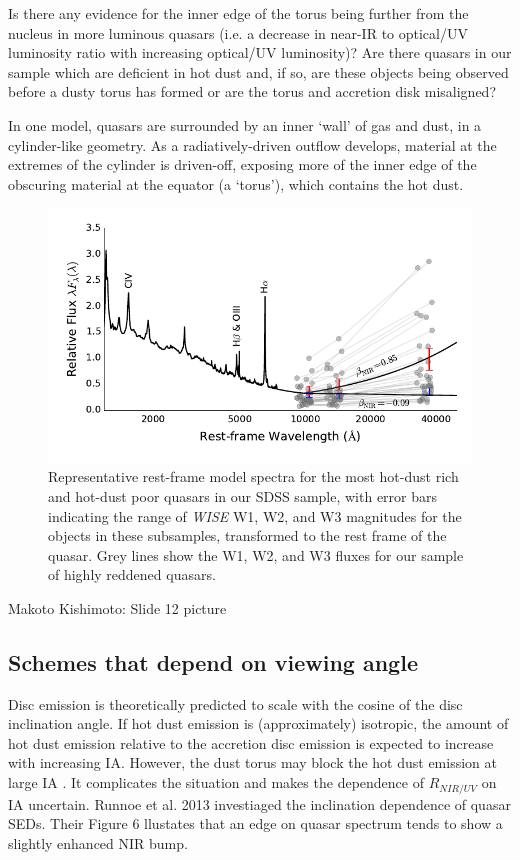 Is there any evidence for the inner edge of the torus being further from the nucleus in more luminous quasars (i.e. a decrease in near-IR to optical/UV luminosity ratio with increasing optical/UV luminosity)? Are there quasars in our sample which are deficient in hot dust and, if so, are these objects being observed before a dusty torus has formed or are the torus and accretion disk misaligned? 

In one model, quasars are surrounded by an inner `wall' of gas and dust, in a cylinder-like geometry. 
As a radiatively-driven outflow develops, material at the extremes of the cylinder is driven-off, exposing more of the inner edge of the obscuring material at the equator (a `torus'), which contains the hot dust. 


\begin{figure}
\centering
  \includegraphics[width=\columnwidth]{figures/chapter06/ntt_proposal_figure2.pdf}
\caption{Representative rest-frame model spectra for the most hot-dust rich and hot-dust poor quasars in our SDSS sample, with error bars indicating the range of {\it WISE} W1, W2, and W3 magnitudes for the objects in these subsamples, transformed to the rest frame of the quasar. Grey lines show the W1, W2, and W3 fluxes for our sample of highly reddened quasars.}
  \label{fig:}
\end{figure}


Makoto Kishimoto: Slide 12 picture 

\subsection{Schemes that depend on viewing angle}

Disc emission is theoretically predicted to scale with the cosine of the disc inclination angle. 
If hot dust emission is (approximately) isotropic, the amount of hot dust emission relative to the accretion disc emission is expected to increase with increasing IA. 
However, the dust torus may block the hot dust emission at large IA \citep{roseboom13}. 
It complicates the situation and makes the dependence of $R_{NIR/UV}$ on IA uncertain. 
Runnoe et al. 2013 investiaged the inclination dependence of quasar SEDs. 
Their Figure 6 llustates that an edge on quasar spectrum tends to show a slightly enhanced NIR bump.

